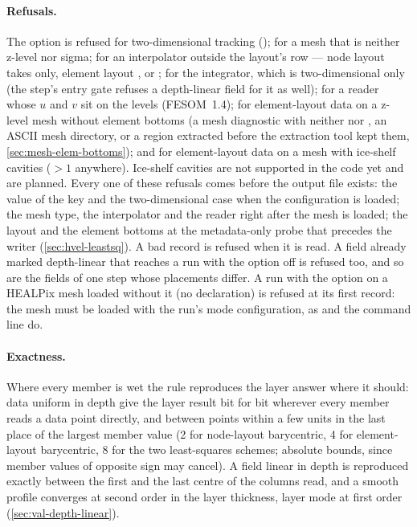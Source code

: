 \paragraph{Refusals.} The option  is refused for two-dimensional tracking
(); for a mesh that is neither z-level nor sigma; for an interpolator outside the
layout's row --- node layout takes  only, element layout ,
 or ; for the  integrator, which is two-dimensional only
(the step's entry gate refuses a depth-linear field for it as well); for a reader whose $u$ and $v$ sit
on the levels (FESOM~1.4); for element-layout data on a z-level mesh without element bottoms (a mesh
diagnostic with neither  nor , an ASCII mesh directory, or a region
extracted before the extraction tool kept them, \cref{sec:mesh-elem-bottoms}); and for element-layout data
on a mesh with ice-shelf cavities (${}>1$ anywhere). Ice-shelf cavities are not supported in
the code yet and are planned. Every one of these refusals comes before the output file exists: the value of
the key and the two-dimensional case when the configuration is loaded; the mesh type, the interpolator and
the reader right after the mesh is loaded; the layout and the element bottoms at the metadata-only probe
that precedes the writer (\cref{sec:hvel-leastsq}).
A bad record is refused when it is read. A field already marked depth-linear that reaches a run with the
option off is refused too, and so are the fields of one step whose placements differ. A run with the option
on a HEALPix mesh loaded without it (no declaration) is refused at its first record: the mesh must be loaded
with the run's mode configuration, as  and the command line do.


\paragraph{Exactness.} Where every member is wet the rule reproduces the layer answer where it should:
data uniform in depth give the layer result bit for bit wherever every member reads a data point directly,
and between points within a few units in the last place of the largest member value (2 for node-layout
barycentric, 4 for element-layout barycentric, 8 for the two least-squares schemes; absolute bounds,
since member values of opposite sign may cancel). A field linear in depth is reproduced exactly between the
first and the last centre of the columns read, and a smooth profile converges at second order in the
layer thickness, layer mode at first order (\cref{sec:val-depth-linear}).

